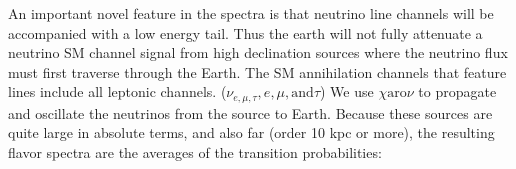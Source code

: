 An important novel feature in the spectra is that neutrino line channels will be accompanied with a low energy tail.
Thus the earth will not fully attenuate a neutrino SM channel signal from high declination sources where the neutrino flux must first traverse through the Earth.
The SM annihilation channels that feature lines include all leptonic channels. ($\nu_{e,\mu,\tau}, e, \mu, \mathrm{and} \tau$)
We use \href{https://iopscience.iop.org/article/10.1088/1475-7516/2020/10/043}{ $\chi \mathrm{aro}\nu$} to propagate and oscillate the neutrinos from the source to Earth.
Because these sources are quite large in absolute terms, and also far (order 10 kpc or more), the resulting flavor spectra are the averages of the transition probabilities:
%
%
%
%
